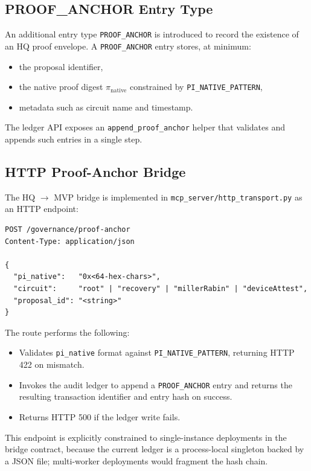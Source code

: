 \documentclass[11pt]{article}
\begin{document}
\subsection{PROOF\_ANCHOR Entry Type}

An additional entry type \texttt{PROOF\_ANCHOR} is introduced to record the existence of an HQ proof envelope.\cite{cite:41} A \texttt{PROOF\_ANCHOR} entry stores, at minimum:
\begin{itemize}[nosep]
  \item the proposal identifier,
  \item the native proof digest \(\pi_{\mathrm{native}}\) constrained by \texttt{PI\_NATIVE\_PATTERN},
  \item metadata such as circuit name and timestamp.
\end{itemize}
The ledger API exposes an \texttt{append\_proof\_anchor} helper that validates and appends such entries in a single step.\cite{cite:41}

\subsection{HTTP Proof-Anchor Bridge}

The HQ \(\rightarrow\) MVP bridge is implemented in \texttt{mcp\_server/http\_transport.py} as an HTTP endpoint:\cite{cite:41}
\begin{verbatim}
POST /governance/proof-anchor
Content-Type: application/json

{
  "pi_native":   "0x<64-hex-chars>",
  "circuit":     "root" | "recovery" | "millerRabin" | "deviceAttest",
  "proposal_id": "<string>"
}
\end{verbatim}
The route performs the following:
\begin{itemize}[nosep]
  \item Validates \texttt{pi\_native} format against \texttt{PI\_NATIVE\_PATTERN}, returning HTTP 422 on mismatch.\cite{cite:41}
  \item Invokes the audit ledger to append a \texttt{PROOF\_ANCHOR} entry and returns the resulting transaction identifier and entry hash on success.\cite{cite:41}
  \item Returns HTTP 500 if the ledger write fails.\cite{cite:41}
\end{itemize}
This endpoint is explicitly constrained to single-instance deployments in the bridge contract, because the current ledger is a process-local singleton backed by a JSON file; multi-worker deployments would fragment the hash chain.\cite{cite:44,cite:46,cite:47}
\end{document}
